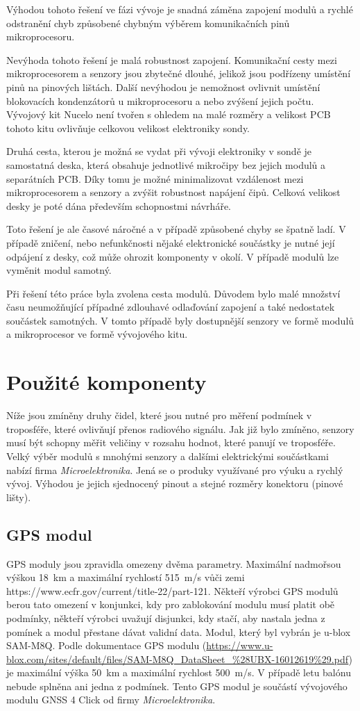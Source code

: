 \documentclass[twoside]{ctuthesis}
\theoremstyle{plain}
\theoremstyle{definition}
\theoremstyle{note}
\begin{document}
		Výhodou tohoto řešení ve fázi vývoje je snadná záměna zapojení modulů a rychlé odstranění chyb způsobené chybným výběrem komunikačních pinů mikroprocesoru.

		Nevýhoda tohoto řešení je malá robustnost zapojení. Komunikační cesty mezi mikroprocesorem a senzory jsou zbytečné dlouhé, jelikož jsou podřízeny umístění pinů na pinových lištách. Další nevýhodou je nemožnost ovlivnit umístění blokovacích kondenzátorů u mikroprocesoru a nebo zvýšení jejich počtu. Vývojový kit Nucelo není tvořen s ohledem na malé rozměry a velikost PCB tohoto kitu ovlivňuje celkovou velikost elektroniky sondy.

		
		Druhá cesta, kterou je možná se vydat při vývoji elektroniky v sondě je samostatná deska, která obsahuje jednotlivé mikročipy bez jejich modulů a separátních PCB. Díky tomu je možné minimalizovat vzdálenost mezi mikroprocesorem a senzory a zvýšit robustnost napájení čipů. Celková velikost desky je poté dána především schopnostmi návrháře. 
		
		Toto řešení je ale časové náročné a v případě způsobené chyby se špatně ladí. V případě zničení, nebo nefunkčnosti nějaké elektronické součástky je nutné její odpájení z desky, což může ohrozit komponenty v okolí. V případě modulů lze vyměnit modul samotný.

		Při řešení této práce byla zvolena cesta modulů. Důvodem bylo malé množství času neumožňující případné zdlouhavé odlaďování zapojení a také nedostatek součástek samotných. V tomto případě byly dostupnější senzory ve formě modulů a mikroprocesor ve formě vývojového kitu. 

		\section{Použité komponenty}
		Níže jsou zmíněny druhy čidel, které jsou nutné pro měření podmínek v troposféře, které ovlivňují přenos radiového signálu. Jak již bylo zmíněno, senzory musí být schopny měřit veličiny v rozsahu hodnot, které panují ve troposféře. Velký výběr modulů s mnohými senzory a dalšími elektrickými součástkami nabízí firma \textit{Microelektronika}. Jená se o produky využívané pro výuku a rychlý vývoj. Výhodou je jejich sjednocený pinout a stejné rozměry konektoru (pinové lišty).

		\subsection{GPS modul}
		GPS moduly jsou zpravidla omezeny dvěma parametry. Maximální nadmořsou výškou 18~km a maximální rychlostí 515~m/s vůči zemi https://www.ecfr.gov/current/title-22/part-121. Někteří výrobci GPS modulů berou tato omezení v konjunkci, kdy pro zablokování modulu musí platit obě podmínky, někteří výrobci uvažují  disjunkci, kdy stačí, aby nastala jedna z pomínek a modul přestane dávat validní data. Modul, který byl vybrán je u-blox SAM-M8Q. Podle dokumentace GPS modulu (\url{https://www.u-blox.com/sites/default/files/SAM-M8Q_DataSheet_%28UBX-16012619%29.pdf}) je maximální výška 50~km a maximální rychlost 500~m/s. V případě letu balónu nebude splněna ani jedna z podmínek. Tento GPS modul je součástí vývojového modulu GNSS 4 Click od firmy \textit{Microelektronika}.
\end{document}
